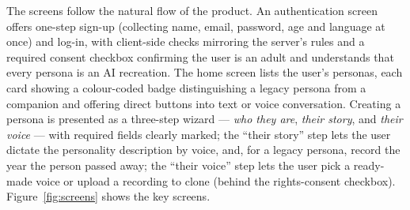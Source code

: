 \documentclass[11pt,a4paper]{report}
\begin{document}
The screens follow the natural flow of the product. An authentication screen offers one-step sign-up (collecting name, email, password, age and language at once) and log-in, with client-side checks mirroring the server's rules and a required consent checkbox confirming the user is an adult and understands that every persona is an AI recreation. The home screen lists the user's personas, each card showing a colour-coded badge distinguishing a legacy persona from a companion and offering direct buttons into text or voice conversation. Creating a persona is presented as a three-step wizard --- \emph{who they are}, \emph{their story}, and \emph{their voice} --- with required fields clearly marked; the ``their story'' step lets the user dictate the personality description by voice, and, for a legacy persona, record the year the person passed away; the ``their voice'' step lets the user pick a ready-made voice or upload a recording to clone (behind the rights-consent checkbox). Figure~\ref{fig:screens} shows the key screens.
\end{document}
